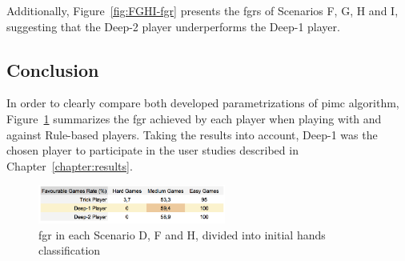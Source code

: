 Additionally, Figure~\ref{fig:FGHI-fgr} presents the \acp{fgr} of Scenarios F, G, H and I, suggesting that the Deep-2 player underperforms the Deep-1 player.

\subsection{Conclusion}

In order to clearly compare both developed parametrizations of \ac{pimc} algorithm, Figure~\ref{fig:DFH-fgr} summarizes the \ac{fgr} achieved by each player when playing with and against Rule-based players.
Taking the results into account, Deep-1 was the chosen player to participate in the user studies described in Chapter~\ref{chapter:results}.

\begin{figure}[h!]
  \centering
    \includegraphics[width=0.55\textwidth]{./img/4/DFH-fgr}
  \caption{\ac{fgr} in each Scenario D, F and H, divided into initial hands classification}
\label{fig:DFH-fgr}
\end{figure}
